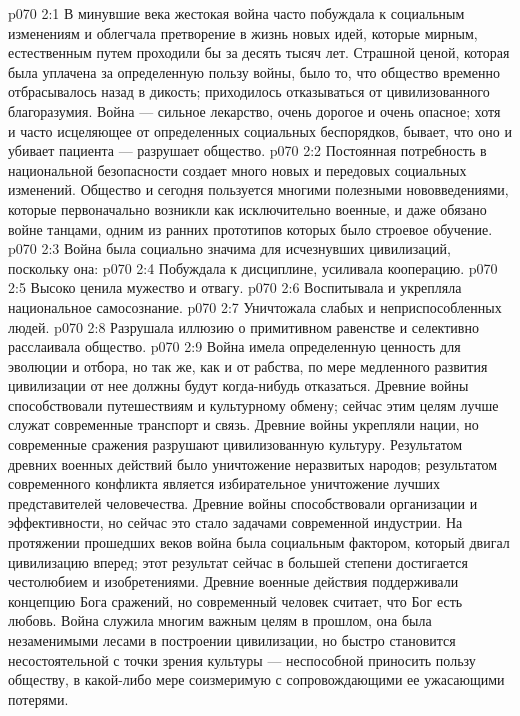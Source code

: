\vs p070 2:1 В минувшие века жестокая война часто побуждала к социальным изменениям и облегчала претворение в жизнь новых идей, которые мирным, естественным путем проходили бы за десять тысяч лет. Страшной ценой, которая была уплачена за определенную пользу войны, было то, что общество временно отбрасывалось назад в дикость; приходилось отказываться от цивилизованного благоразумия. Война --- сильное лекарство, очень дорогое и очень опасное; хотя и часто исцеляющее от определенных социальных беспорядков, бывает, что оно и убивает пациента --- разрушает общество.
\vs p070 2:2 Постоянная потребность в национальной безопасности создает много новых и передовых социальных изменений. Общество и сегодня пользуется многими полезными нововведениями, которые первоначально возникли как исключительно военные, и даже обязано войне танцами, одним из ранних прототипов которых было строевое обучение.
\vs p070 2:3 \pc Война была социально значима для исчезнувших цивилизаций, поскольку она:
\vs p070 2:4 \bibnobreakspace Побуждала к дисциплине, усиливала кооперацию.
\vs p070 2:5 \bibnobreakspace Высоко ценила мужество и отвагу.
\vs p070 2:6 \bibnobreakspace Воспитывала и укрепляла национальное самосознание.
\vs p070 2:7 \bibnobreakspace Уничтожала слабых и неприспособленных людей.
\vs p070 2:8 \bibnobreakspace Разрушала иллюзию о примитивном равенстве и селективно расслаивала общество.
\vs p070 2:9 \pc Война имела определенную ценность для эволюции и отбора, но так же, как и от рабства, по мере медленного развития цивилизации от нее должны будут когда\hyp{}нибудь отказаться. Древние войны способствовали путешествиям и культурному обмену; сейчас этим целям лучше служат современные транспорт и связь. Древние войны укрепляли нации, но современные сражения разрушают цивилизованную культуру. Результатом древних военных действий было уничтожение неразвитых народов; результатом современного конфликта является избирательное уничтожение лучших представителей человечества. Древние войны способствовали организации и эффективности, но сейчас это стало задачами современной индустрии. На протяжении прошедших веков война была социальным фактором, который двигал цивилизацию вперед; этот результат сейчас в большей степени достигается честолюбием и изобретениями. Древние военные действия поддерживали концепцию Бога сражений, но современный человек считает, что Бог есть любовь. Война служила многим важным целям в прошлом, она была незаменимыми лесами в построении цивилизации, но быстро становится несостоятельной с точки зрения культуры --- неспособной приносить пользу обществу, в какой\hyp{}либо мере соизмеримую с сопровождающими ее ужасающими потерями.
